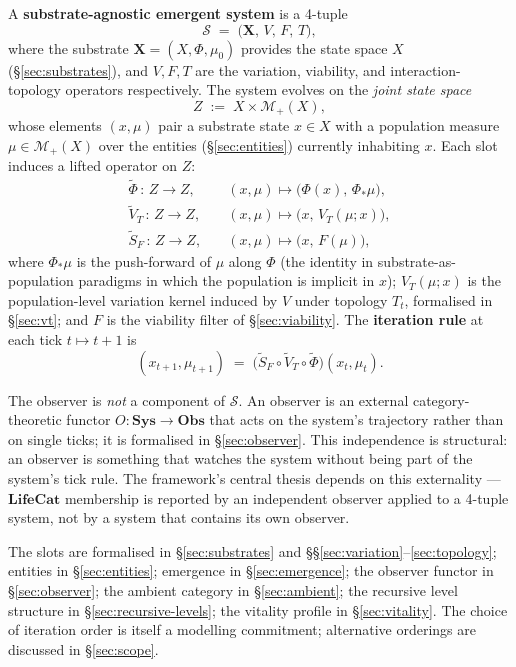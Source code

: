 \documentclass[journal]{IEEEtran}
\theoremstyle{plain}
\theoremstyle{definition}
\theoremstyle{plain}
\newcommand{\Mplus}{\mathcal{M}_{+}}
\newcommand{\X}{\mathbf{X}}
\begin{document}
A \textbf{substrate-agnostic emergent system} is a 4-tuple
\[
  \mathcal{S} \;=\; \big( \X, \, V, \, F, \, T \big),
\]
where the substrate $\X = (X,\Phi,\mu_0)$ provides the state space $X$
(\S\ref{sec:substrates}), and $V,F,T$ are the variation, viability, and
interaction-topology operators respectively. The system evolves on the
\emph{joint state space}
\[
  Z \;:=\; X \times \Mplus(X),
\]
whose elements $(x,\mu)$ pair a substrate state $x \in X$ with a population
measure $\mu \in \Mplus(X)$ over the entities (\S\ref{sec:entities})
currently inhabiting $x$. Each slot induces a lifted operator on $Z$:
\begin{align*}
  \widetilde\Phi    \,:\, Z \to Z,\quad &(x,\mu) \mapsto \big(\Phi(x),\,\Phi_{*}\mu\big),\\
  \widetilde V_{T}  \,:\, Z \to Z,\quad &(x,\mu) \mapsto \big(x,\,V_{T}(\mu;x)\big),\\
  \widetilde S_{F}  \,:\, Z \to Z,\quad &(x,\mu) \mapsto \big(x,\,F(\mu)\big),
\end{align*}
where $\Phi_{*}\mu$ is the push-forward of $\mu$ along $\Phi$ (the identity
in substrate-as-population paradigms in which the population is implicit in
$x$); $V_{T}(\mu;x)$ is the population-level variation kernel induced by $V$
under topology $T_t$, formalised in \S\ref{sec:vt}; and $F$ is the viability
filter of \S\ref{sec:viability}. The \textbf{iteration rule} at each tick
$t \mapsto t+1$ is
\[
  (x_{t+1}, \mu_{t+1}) \;=\;
  \big(\widetilde S_{F} \circ \widetilde V_{T} \circ \widetilde\Phi\big)(x_t, \mu_t).
\]

The observer is \emph{not} a component of $\mathcal{S}$. An observer is an
external category-theoretic functor $O : \mathbf{Sys} \to \mathbf{Obs}$ that
acts on the system's trajectory rather than on single ticks; it is
formalised in \S\ref{sec:observer}. This independence is structural: an
observer is something that watches the system without being part of the
system's tick rule. The framework's central thesis depends on this
externality --- $\mathbf{LifeCat}$ membership is reported by an independent
observer applied to a 4-tuple system, not by a system that contains its own
observer.

The slots are formalised in \S\ref{sec:substrates} and
\S\S\ref{sec:variation}--\ref{sec:topology}; entities in
\S\ref{sec:entities}; emergence in \S\ref{sec:emergence}; the observer
functor in \S\ref{sec:observer}; the ambient category in
\S\ref{sec:ambient}; the recursive level structure in
\S\ref{sec:recursive-levels}; the vitality profile in
\S\ref{sec:vitality}. The choice of iteration order is itself a modelling
commitment; alternative orderings are discussed in \S\ref{sec:scope}.
\end{document}
